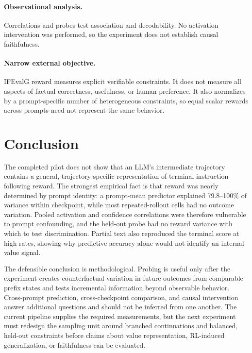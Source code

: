 \documentclass[manuscript,screen,nonacm]{acmart}
\begin{document}
\paragraph{Observational analysis.}
Correlations and probes test association and decodability. No activation
intervention was performed, so the experiment does not establish causal
faithfulness.

\paragraph{Narrow external objective.}
IFEvalG reward measures explicit verifiable constraints. It does not measure
all aspects of factual correctness, usefulness, or human preference. It also
normalizes by a prompt-specific number of heterogeneous constraints, so equal
scalar rewards across prompts need not represent the same behavior.

\section{Conclusion}

The completed pilot does not show that an LLM's intermediate trajectory
contains a general, trajectory-specific representation of terminal
instruction-following reward. The strongest empirical fact is that reward was
nearly determined by prompt identity: a prompt-mean predictor explained
79.8--100\% of variance within checkpoint, while most repeated-rollout cells
had no outcome variation. Pooled activation and confidence correlations were
therefore vulnerable to prompt confounding, and the held-out probe had no
reward variance with which to test discrimination. Partial text also reproduced
the terminal score at high rates, showing why predictive accuracy alone would
not identify an internal value signal.

The defensible conclusion is methodological. Probing is useful only after the
experiment creates counterfactual variation in future outcomes from comparable
prefix states and tests incremental information beyond observable behavior.
Cross-prompt prediction, cross-checkpoint comparison, and causal intervention
answer additional questions and should not be inferred from one another. The
current pipeline supplies the required measurements, but the next experiment
must redesign the sampling unit around branched continuations and balanced,
held-out constraints before claims about value representation, RL-induced
generalization, or faithfulness can be evaluated.
\end{document}
